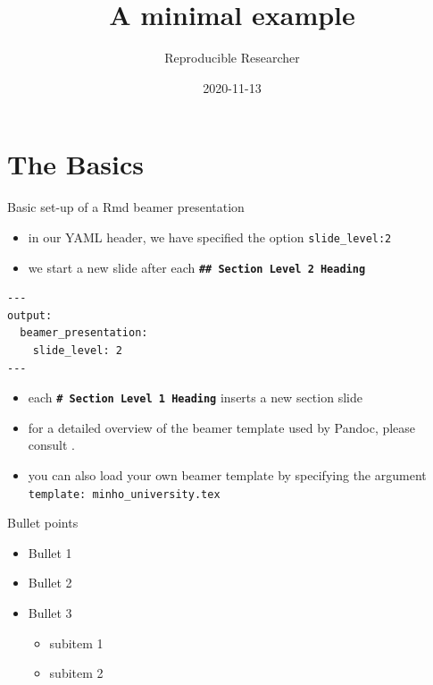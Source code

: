 \documentclass[
  10pt,
  ignorenonframetext,
]{beamer}
\title{A minimal example}
\author{Reproducible Researcher}
\date{2020-11-13}
\institute{University of Minho}
\providecommand{\tightlist}{%
  \setlength{\itemsep}{0pt}\setlength{\parskip}{0pt}}
\begin{document}
\frame{\titlepage}

\begin{frame}[allowframebreaks]
  \tableofcontents[hideallsubsections]
\end{frame}
\hypertarget{the-basics}{%
\section{The Basics}\label{the-basics}}

\begin{frame}[fragile]{Basic set-up of a Rmd beamer presentation}
\protect\hypertarget{basic-set-up-of-a-rmd-beamer-presentation}{}
\begin{itemize}[<+->]
\tightlist
\item
  in our YAML header, we have specified the option
  \texttt{slide\_level:2}
\item
  \rightarrow we start a new slide after each
  \textbf{\texttt{\#\#\ Section\ Level\ 2\ Heading}}
\end{itemize}

\pause

\begin{verbatim}
---
output: 
  beamer_presentation: 
    slide_level: 2
---    
\end{verbatim}

\pause

\begin{itemize}[<+->]
\tightlist
\item
  each \textbf{\texttt{\#\ Section\ Level\ 1\ Heading}} inserts a new
  section slide
\item
  for a detailed overview of the beamer template used by Pandoc, please
  consult \href{}{}.
\item
  you can also load your own beamer template by specifying the argument
  \texttt{template:\ minho\_university.tex}
\end{itemize}
\end{frame}

\begin{frame}{Bullet points}
\protect\hypertarget{bullet-points}{}
\begin{itemize}[<+->]
\tightlist
\item
  Bullet 1
\item
  Bullet 2
\item
  Bullet 3

  \begin{itemize}[<+->]
  \tightlist
  \item
    subitem 1
  \item
    subitem 2
  \end{itemize}
\end{itemize}
\end{frame}
\end{document}
